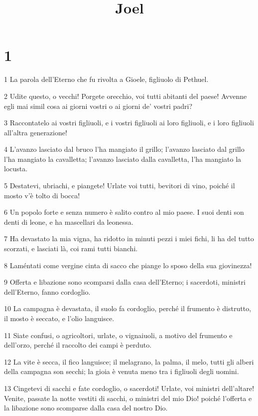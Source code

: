 

\title{Joel}


\chapter{1}

\par 1 La parola dell'Eterno che fu rivolta a Gioele, figliuolo di Pethuel.
\par 2 Udite questo, o vecchi! Porgete orecchio, voi tutti abitanti del paese! Avvenne egli mai simil cosa ai giorni vostri o ai giorni de' vostri padri?
\par 3 Raccontatelo ai vostri figliuoli, e i vostri figliuoli ai loro figliuoli, e i loro figliuoli all'altra generazione!
\par 4 L'avanzo lasciato dal bruco l'ha mangiato il grillo; l'avanzo lasciato dal grillo l'ha mangiato la cavalletta; l'avanzo lasciato dalla cavalletta, l'ha mangiato la locusta.
\par 5 Destatevi, ubriachi, e piangete! Urlate voi tutti, bevitori di vino, poiché il mosto v'è tolto di bocca!
\par 6 Un popolo forte e senza numero è salito contro al mio paese. I suoi denti son denti di leone, e ha mascellari da leonessa.
\par 7 Ha devastato la mia vigna, ha ridotto in minuti pezzi i miei fichi, li ha del tutto scorzati, e lasciati là, coi rami tutti bianchi.
\par 8 Laméntati come vergine cinta di sacco che piange lo sposo della sua giovinezza!
\par 9 Offerta e libazione sono scomparsi dalla casa dell'Eterno; i sacerdoti, ministri dell'Eterno, fanno cordoglio.
\par 10 La campagna è devastata, il suolo fa cordoglio, perché il frumento è distrutto, il mosto è seccato, e l'olio languisce.
\par 11 Siate confusi, o agricoltori, urlate, o vignaiuoli, a motivo del frumento e dell'orzo, perché il raccolto dei campi è perduto.
\par 12 La vite è secca, il fico languisce; il melagrano, la palma, il melo, tutti gli alberi della campagna son secchi; la gioia è venuta meno tra i figliuoli degli uomini.
\par 13 Cingetevi di sacchi e fate cordoglio, o sacerdoti! Urlate, voi ministri dell'altare! Venite, passate la notte vestiti di sacchi, o ministri del mio Dio! poiché l'offerta e la libazione sono scomparse dalla casa del nostro Dio.
